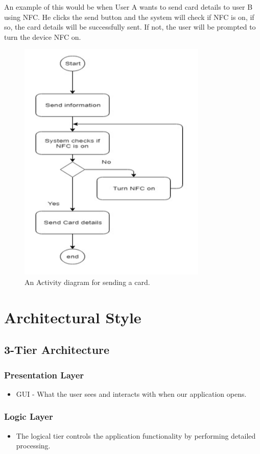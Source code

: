 \documentclass[english]{article}
\begin{document}
		An example of this would be when User A wants to send card details to user B using NFC. He clicks the send button and the system will check if NFC is on, if so, the card details will be successfully sent. If not, the user will be prompted to turn the device NFC on. 
		
		 	\begin{figure}[ht!]
		 		\centering
		 		\includegraphics[width=90mm]{SystemType.PNG}
		 		\caption{An Activity diagram for sending a card.}
		 	\end{figure}
	 	
	 
	
	
	\section{Architectural Style}
	\subsection{3-Tier Architecture}
	\subsubsection{Presentation Layer}
		\begin{itemize}
		\item GUI - What the user sees and interacts with when our application opens.
		\end{itemize}
	
	\subsubsection{Logic Layer}
		\begin{itemize}
			\item 	The logical tier controls the application functionality by performing detailed processing.
		\end{itemize}
\end{document}
